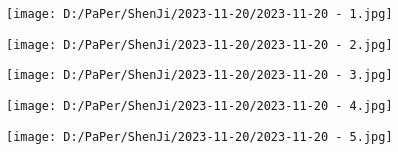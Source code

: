 \documentclass{article}
\begin{document}
\begin{figure}[h!]
	\centering
	\texttt{[image: D:/PaPer/ShenJi/2023-11-20/2023-11-20 - 1.jpg]}
\end{figure}

\begin{figure}[h!]
	\centering
	\texttt{[image: D:/PaPer/ShenJi/2023-11-20/2023-11-20 - 2.jpg]}
\end{figure}

\begin{figure}[h!]
	\centering
	\texttt{[image: D:/PaPer/ShenJi/2023-11-20/2023-11-20 - 3.jpg]}
\end{figure}

\begin{figure}[h!]
	\centering
	\texttt{[image: D:/PaPer/ShenJi/2023-11-20/2023-11-20 - 4.jpg]}
\end{figure}

\begin{figure}[h!]
	\centering
	\texttt{[image: D:/PaPer/ShenJi/2023-11-20/2023-11-20 - 5.jpg]}
\end{figure}
\end{document}

